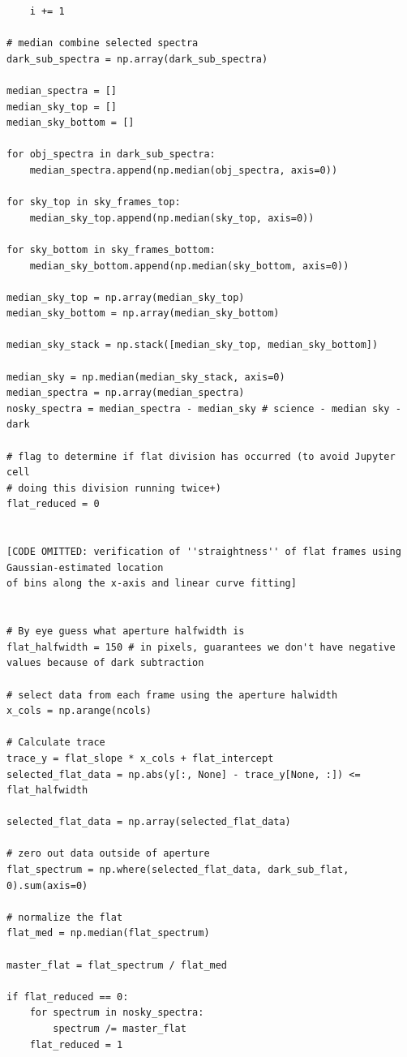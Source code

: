 \documentclass[twocolumn]{aastex702}
\begin{document}
\begin{verbatim}
    i += 1
    
# median combine selected spectra
dark_sub_spectra = np.array(dark_sub_spectra)

median_spectra = []
median_sky_top = []
median_sky_bottom = []

for obj_spectra in dark_sub_spectra:
    median_spectra.append(np.median(obj_spectra, axis=0))

for sky_top in sky_frames_top:
    median_sky_top.append(np.median(sky_top, axis=0))
    
for sky_bottom in sky_frames_bottom:
    median_sky_bottom.append(np.median(sky_bottom, axis=0))

median_sky_top = np.array(median_sky_top)
median_sky_bottom = np.array(median_sky_bottom)

median_sky_stack = np.stack([median_sky_top, median_sky_bottom])

median_sky = np.median(median_sky_stack, axis=0)
median_spectra = np.array(median_spectra)
nosky_spectra = median_spectra - median_sky # science - median sky - dark

# flag to determine if flat division has occurred (to avoid Jupyter cell 
# doing this division running twice+)
flat_reduced = 0 


[CODE OMITTED: verification of ''straightness'' of flat frames using Gaussian-estimated location 
of bins along the x-axis and linear curve fitting]


# By eye guess what aperture halfwidth is
flat_halfwidth = 150 # in pixels, guarantees we don't have negative values because of dark subtraction

# select data from each frame using the aperture halwidth
x_cols = np.arange(ncols)

# Calculate trace 
trace_y = flat_slope * x_cols + flat_intercept
selected_flat_data = np.abs(y[:, None] - trace_y[None, :]) <= flat_halfwidth

selected_flat_data = np.array(selected_flat_data)

# zero out data outside of aperture
flat_spectrum = np.where(selected_flat_data, dark_sub_flat, 0).sum(axis=0) 

# normalize the flat
flat_med = np.median(flat_spectrum)

master_flat = flat_spectrum / flat_med

if flat_reduced == 0:
    for spectrum in nosky_spectra:
        spectrum /= master_flat
    flat_reduced = 1

		\end{verbatim}
\end{document}
